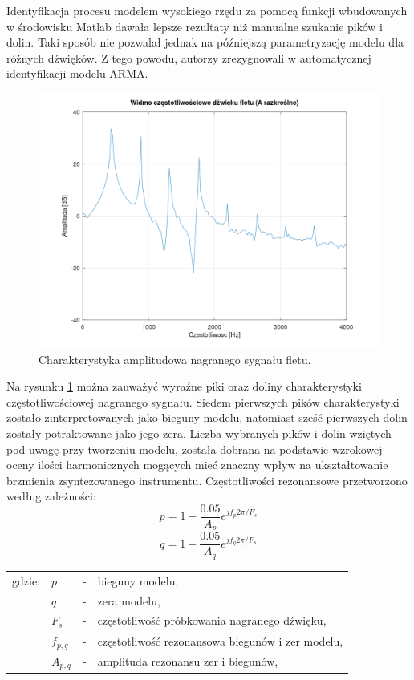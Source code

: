 Identyfikacja procesu modelem wysokiego rzędu za pomocą funkcji wbudowanych w środowisku Matlab dawała lepsze rezultaty niż manualne szukanie pików i dolin. Taki sposób nie pozwalał jednak na późniejszą parametryzację modelu dla różnych dźwięków. Z tego powodu, autorzy zrezygnowali w automatycznej identyfikacji modelu ARMA.

\begin{figure}[H]
	\centering
	\includegraphics[width=12cm]{grafiki/flute_spectrum_orig}
	\captionsetup{justification=centering}
	\caption{Charakterystyka amplitudowa nagranego sygnału fletu.}
	\label{rys:flute_spectrum}
\end{figure}

Na rysunku \ref{rys:flute_spectrum} można zauważyć wyraźne piki oraz doliny charakterystyki częstotliwościowej nagranego sygnału. Siedem pierwszych pików charakterystyki zostało zinterpretowanych jako bieguny modelu, natomiast sześć pierwszych dolin zostały potraktowane jako jego zera. Liczba wybranych pików i dolin wziętych pod uwagę przy tworzeniu modelu, została dobrana na podstawie wzrokowej oceny ilości harmonicznych mogących mieć znaczny wpływ na ukształtowanie brzmienia zsyntezowanego instrumentu. Częstotliwości rezonansowe przetworzono według zależności:
\begin{equation} \label{equ:flute_bieguny}
p = 1-\frac{0.05}{A_{p}}e^{jf_{p}2\pi/F_{s}}
\end{equation}
\begin{equation} \label{equ:flute_doliny}
q = 1-\frac{0.05}{A_{q}}e^{jf_{q}2\pi/F_{s}}
\end{equation}
\begin{tabular}{ l l l l}
	gdzie: & $p$ &  - & bieguny modelu, \\
	&	$q$ & - &  zera modelu, \\
	&	$F_{s}$ & - &  częstotliwość próbkowania nagranego dźwięku,\\
	&	$f_{p,q}$ & - &  częstotliwość rezonansowa biegunów i zer modelu, \\
	&	$A_{p,q}$ & - &  amplituda rezonansu zer i biegunów, \\
\end{tabular} \\

